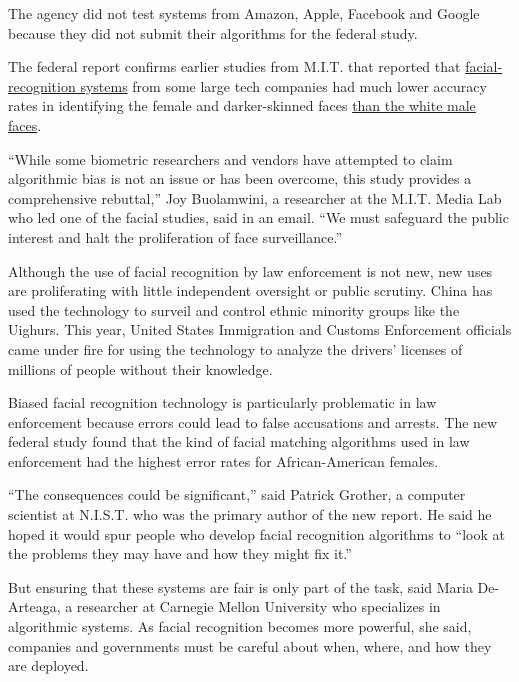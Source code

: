 The agency did not test systems from Amazon, Apple, Facebook and Google
because they did not submit their algorithms for the federal study.

The federal report confirms earlier studies from M.I.T. that reported
that
\href{https://www.nytimes3xbfgragh.onion/2019/05/15/business/facial-recognition-software-controversy.html}{facial-recognition
systems} from some large tech companies had much lower accuracy rates in
identifying the female and darker-skinned faces
\href{https://www.nytimes3xbfgragh.onion/2018/02/09/technology/facial-recognition-race-artificial-intelligence.html}{than
the white male faces}.

``While some biometric researchers and vendors have attempted to claim
algorithmic bias is not an issue or has been overcome, this study
provides a comprehensive rebuttal,'' Joy Buolamwini, a researcher at the
M.I.T. Media Lab who led one of the facial studies, said in an email.
``We must safeguard the public interest and halt the proliferation of
face surveillance.''

Although the use of facial recognition by law enforcement is not new,
new uses are proliferating with little independent oversight or public
scrutiny. China has used the technology to surveil and control ethnic
minority groups like the Uighurs. This year, United States Immigration
and Customs Enforcement officials came under fire for using the
technology to analyze the drivers' licenses of millions of people
without their knowledge.

Biased facial recognition technology is particularly problematic in law
enforcement because errors could lead to false accusations and arrests.
The new federal study found that the kind of facial matching algorithms
used in law enforcement had the highest error rates for African-American
females.

``The consequences could be significant,'' said Patrick Grother, a
computer scientist at N.I.S.T. who was the primary author of the new
report. He said he hoped it would spur people who develop facial
recognition algorithms to ``look at the problems they may have and how
they might fix it.''

But ensuring that these systems are fair is only part of the task, said
Maria De-Arteaga, a researcher at Carnegie Mellon University who
specializes in algorithmic systems. As facial recognition becomes more
powerful, she said, companies and governments must be careful about
when, where, and how they are deployed.

